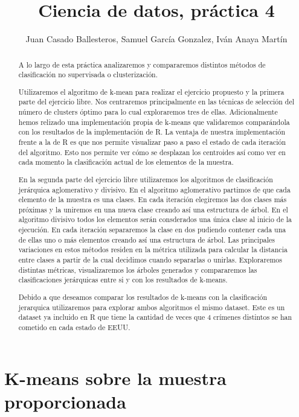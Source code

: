 \documentclass [a4paper] {article}
\title{Ciencia de datos, práctica 4}
\author{Juan Casado Ballesteros, Samuel García Gonzalez, Iván Anaya Martín}
\begin{document}
\maketitle

\begin{abstract}
A lo largo de esta práctica analizaremos y compararemos distintos métodos de clasificación no supervisada o clusterización.

Utilizaremos el algoritmo de k-mean para realizar el ejercicio propuesto y la primera parte del ejercicio libre.
Nos centraremos principalmente en las técnicas de selección del número de clusters óptimo para lo cual exploraremos tres de ellas.
Adicionalmente hemos relizado una implementación propia de k-means que validaremos comparándola con los resultados de la implementación de R.
La ventaja de nuestra implementación frente a la de R es que nos permite visualizar paso a paso el estado de cada iteración del algoritmo.
Esto nos permite ver cómo se desplazan los centroides así como ver en cada momento la clasificación actual de los elementos de la muestra.

En la segunda parte del ejercicio libre utilizaremos los algoritmos de clasificación jerárquica aglomerativo y divisivo.
En el algoritmo aglomerativo partimos de que cada elemento de la muestra es una clases.
En cada iteración elegiremos las dos clases más próximas y la uniremos en una nueva clase creando así una estructura de árbol.
En el algoritmo divisivo todos los elementos serán consderados una única clase al inicio de la ejecución.
En cada iteración separaremos la clase en dos pudiendo contener cada una de ellas uno o más elementos creando así una estructura de árbol.
Las principales variaciones en estos métodos residen en la métrica utilizada para calcular la distancia entre clases a partir de la cual decidimos cuando separarlas o unirlas.
Exploraremos distintas métricas, visualizaremos los árboles generados y compararemos las clasificaciones jerárquicas entre si y con los resultados de k-means.

Debido a que deseamos comparar los resultados de k-means con la clasificación jerarquica utilizaremos para explorar ambos algoritmos el mismo dataset.
Este es un dataset ya incluido en R que tiene la cantidad de veces que 4 crímenes distintos se han cometido en cada estado de EEUU.
\end{abstract}

\newpage
\tableofcontents


\newpage
\section{K-means sobre la muestra proporcionada}
\end{document}
